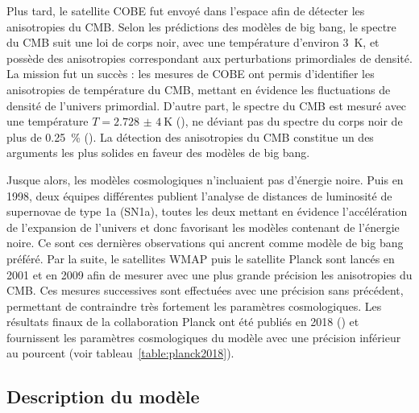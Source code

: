 \documentclass[11pt, twoside, a4paper, openright]{report}
\begin{document}
Plus tard, le satellite COBE fut envoyé dans l'espace afin de détecter les anisotropies du CMB. Selon les prédictions des modèles de big bang, le spectre du CMB suit une loi de corps noir, avec une température d'environ \SI{3}{\kelvin}, et possède des anisotropies correspondant aux perturbations primordiales de densité. La mission fut un succès : les mesures de COBE ont permis d'identifier les anisotropies de température du CMB, mettant en évidence les fluctuations de densité de l'univers primordial. D'autre part, le spectre du CMB est mesuré avec une température $T = \SI{2,728(4)}{\kelvin}$ (\cite{Fixsen1996}), ne déviant pas du spectre du corps noir de plus de \SI{0,25}{\percent} (\cite{Bennett1993}). La détection des anisotropies du CMB constitue un des arguments les plus solides en faveur des modèles de big bang.

Jusque alors, les modèles cosmologiques n'incluaient pas d'énergie noire. Puis en 1998, deux équipes différentes publient l'analyse de distances de luminosité de supernovae de type 1a (SN1a), toutes les deux mettant en évidence l'accélération de l'expansion de l'univers et donc favorisant les modèles contenant de l'énergie noire. Ce sont ces dernières observations qui ancrent \lcdm{} comme modèle de big bang préféré. Par la suite, le satellites WMAP puis le satellite Planck sont lancés en 2001 et en 2009 afin de mesurer avec une plus grande précision les anisotropies du CMB. Ces mesures successives sont effectuées avec une précision sans précédent, permettant de contraindre très fortement les paramètres cosmologiques. Les résultats finaux de la collaboration Planck ont été publiés en 2018 (\cite{Collaboration2018}) et fournissent les paramètres cosmologiques du modèle \lcdm{} avec une précision inférieur au pourcent (voir tableau~\ref{table:planck2018}).

\subsection{Description du modèle}
\label{subsec:descri_mod}
\end{document}
